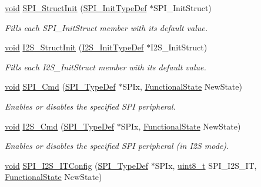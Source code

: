 \begin{DoxyCompactItemize}
\hyperlink{usb__devapi_8h_afabf60e7f57651d6d595a02c75f07cd0}{void} \hyperlink{group___s_p_i___private___functions_ga9a0116f88cc2c4478c270f05608703f1}{S\+P\+I\+\_\+\+Struct\+Init} (\hyperlink{struct_s_p_i___init_type_def}{S\+P\+I\+\_\+\+Init\+Type\+Def} $\ast$S\+P\+I\+\_\+\+Init\+Struct)
\begin{DoxyCompactList}\small\item\em Fills each S\+P\+I\+\_\+\+Init\+Struct member with its default value. \end{DoxyCompactList}\item 
\hyperlink{usb__devapi_8h_afabf60e7f57651d6d595a02c75f07cd0}{void} \hyperlink{group___s_p_i___private___functions_ga7470ec1d0759fdeeb42c7fe71a3b41b7}{I2\+S\+\_\+\+Struct\+Init} (\hyperlink{struct_i2_s___init_type_def}{I2\+S\+\_\+\+Init\+Type\+Def} $\ast$I2\+S\+\_\+\+Init\+Struct)
\begin{DoxyCompactList}\small\item\em Fills each I2\+S\+\_\+\+Init\+Struct member with its default value. \end{DoxyCompactList}\item 
\hyperlink{usb__devapi_8h_afabf60e7f57651d6d595a02c75f07cd0}{void} \hyperlink{group___s_p_i___private___functions_gaa31357879a65ee1ed7223f3b9114dcf3}{S\+P\+I\+\_\+\+Cmd} (\hyperlink{struct_s_p_i___type_def}{S\+P\+I\+\_\+\+Type\+Def} $\ast$S\+P\+Ix, \hyperlink{agilefox_2library_2inc_2stm32f10x__type_8h_ac9a7e9a35d2513ec15c3b537aaa4fba1}{Functional\+State} New\+State)
\begin{DoxyCompactList}\small\item\em Enables or disables the specified S\+PI peripheral. \end{DoxyCompactList}\item 
\hyperlink{usb__devapi_8h_afabf60e7f57651d6d595a02c75f07cd0}{void} \hyperlink{group___s_p_i___private___functions_gafe061c71bbc5b4224f3f2884dc53739e}{I2\+S\+\_\+\+Cmd} (\hyperlink{struct_s_p_i___type_def}{S\+P\+I\+\_\+\+Type\+Def} $\ast$S\+P\+Ix, \hyperlink{agilefox_2library_2inc_2stm32f10x__type_8h_ac9a7e9a35d2513ec15c3b537aaa4fba1}{Functional\+State} New\+State)
\begin{DoxyCompactList}\small\item\em Enables or disables the specified S\+PI peripheral (in I2S mode). \end{DoxyCompactList}\item 
\hyperlink{usb__devapi_8h_afabf60e7f57651d6d595a02c75f07cd0}{void} \hyperlink{group___s_p_i___private___functions_ga17f4ef132e8ddbf94cb6b1688d181e41}{S\+P\+I\+\_\+\+I2\+S\+\_\+\+I\+T\+Config} (\hyperlink{struct_s_p_i___type_def}{S\+P\+I\+\_\+\+Type\+Def} $\ast$S\+P\+Ix, \hyperlink{_p_e___types_8h_aba7bc1797add20fe3efdf37ced1182c5}{uint8\+\_\+t} S\+P\+I\+\_\+\+I2\+S\+\_\+\+IT, \hyperlink{agilefox_2library_2inc_2stm32f10x__type_8h_ac9a7e9a35d2513ec15c3b537aaa4fba1}{Functional\+State} New\+State)

\end{DoxyCompactItemize}
